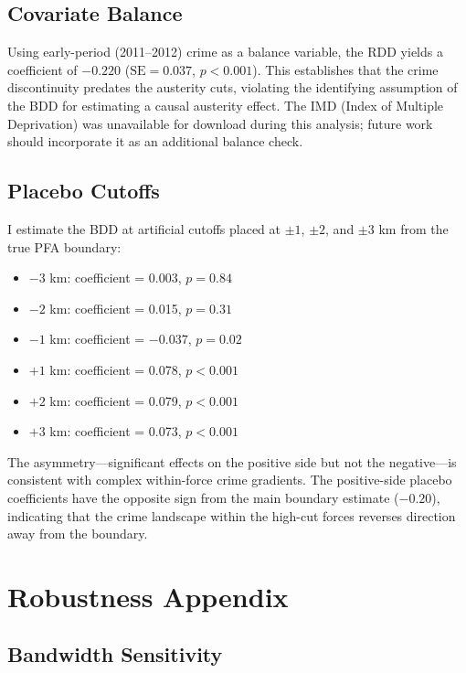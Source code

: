 \documentclass[12pt]{article}
\begin{document}
\subsection{Covariate Balance}

Using early-period (2011--2012) crime as a balance variable, the RDD yields a coefficient of $-0.220$ ($\text{SE} = 0.037$, $p < 0.001$). This establishes that the crime discontinuity predates the austerity cuts, violating the identifying assumption of the BDD for estimating a causal austerity effect. The IMD (Index of Multiple Deprivation) was unavailable for download during this analysis; future work should incorporate it as an additional balance check.

\subsection{Placebo Cutoffs}

I estimate the BDD at artificial cutoffs placed at $\pm 1$, $\pm 2$, and $\pm 3$ km from the true PFA boundary:

\begin{itemize}
    \item $-3$ km: coefficient = 0.003, $p = 0.84$
    \item $-2$ km: coefficient = 0.015, $p = 0.31$
    \item $-1$ km: coefficient = $-0.037$, $p = 0.02$
    \item $+1$ km: coefficient = 0.078, $p < 0.001$
    \item $+2$ km: coefficient = 0.079, $p < 0.001$
    \item $+3$ km: coefficient = 0.073, $p < 0.001$
\end{itemize}

The asymmetry---significant effects on the positive side but not the negative---is consistent with complex within-force crime gradients. The positive-side placebo coefficients have the opposite sign from the main boundary estimate ($-0.20$), indicating that the crime landscape within the high-cut forces reverses direction away from the boundary.


\section{Robustness Appendix}

\subsection{Bandwidth Sensitivity}
\end{document}
